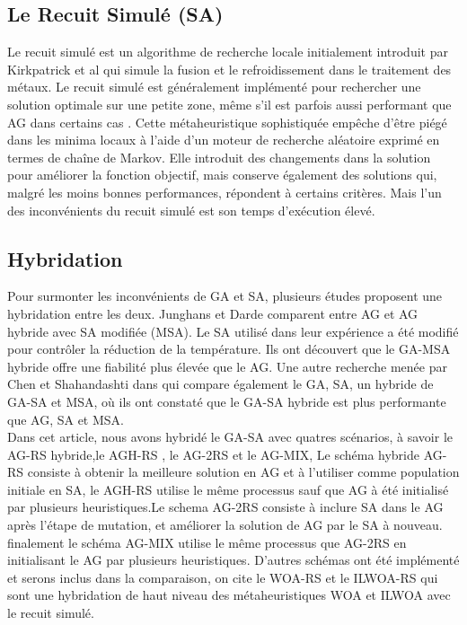 \documentclass[preprint]{elsarticle}
\begin{document}
\subsection{Le Recuit Simulé (SA)}
Le recuit simulé est un algorithme de recherche locale initialement introduit par Kirkpatrick et al \cite{kirk} qui simule la fusion et le refroidissement dans le traitement des métaux. Le recuit simulé est généralement implémenté pour rechercher une solution optimale sur une petite zone, même s'il est parfois aussi performant que AG dans certains cas \cite{Alkhateeb}.
Cette métaheuristique sophistiquée empêche d'être piégé dans les minima locaux à l'aide d'un moteur de recherche aléatoire exprimé en termes de chaîne de Markov. Elle introduit des changements dans la solution pour améliorer la fonction objectif, mais conserve également des solutions qui, malgré les moins bonnes performances, répondent à certains critères. Mais l’un des inconvénients du recuit simulé est son temps d'exécution élevé. 

\subsection{Hybridation}
Pour surmonter les inconvénients  de GA et SA, plusieurs études proposent une hybridation entre les deux.
Junghans et Darde \cite{Junghans} comparent entre AG et AG hybride avec SA modifiée (MSA).
Le SA utilisé dans leur expérience a été modifié pour contrôler la réduction de la température.
Ils ont découvert que le GA-MSA hybride offre une fiabilité plus élevée que le AG.
Une autre recherche menée par Chen et Shahandashti dans \cite{Chen} qui compare également le GA, SA, un hybride de GA-SA et MSA, où ils ont constaté que le GA-SA hybride est plus performante que AG, SA et MSA. \\
Dans cet article, nous avons hybridé le GA-SA avec quatres scénarios, à savoir le AG-RS hybride,le AGH-RS , le AG-2RS et le AG-MIX, Le schéma hybride AG-RS consiste à obtenir la meilleure solution en AG et à l'utiliser comme population initiale en SA,
le AGH-RS utilise le même processus sauf que AG à été initialisé par plusieurs heuristiques.Le schema AG-2RS  consiste à inclure SA dans le AG après l’étape de mutation, et améliorer la solution de AG par le SA à nouveau. finalement le schéma AG-MIX utilise le même processus que AG-2RS en initialisant le AG par plusieurs heuristiques. 
D’autres schémas ont été implémenté et serons inclus dans la comparaison, on cite le WOA-RS  et le ILWOA-RS qui sont une hybridation de haut niveau des métaheuristiques WOA et ILWOA avec le recuit simulé.
\end{document}
